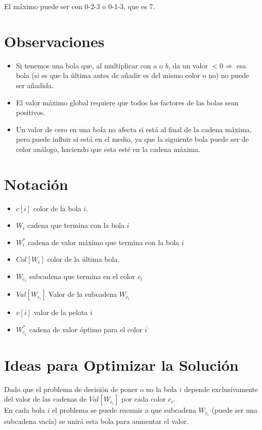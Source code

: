 \documentclass{article}
\begin{document}
El máximo puede ser con 0-2-3 o 0-1-3, que es 7.

\section*{Observaciones}
\begin{itemize}
    \item Si tenemos una bola que, al multiplicar con $a$ o $b$, da un valor $< 0 \Rightarrow$ esa bola (si es que la última antes de añadir es del mismo color o no) no puede ser añadida.
    \item El valor máximo global requiere que todos los factores de las bolas sean positivos.
    \item Un valor de cero en una bola no afecta si está al final de la cadena máxima, pero puede influir si está en el medio, ya que la siguiente bola puede ser de color análogo, haciendo que esta esté en la cadena máxima.
\end{itemize}


\section*{Notación}
\begin{itemize}
    \item $c[i]$ color de la bola $i$.
    \item $W_i$ cadena que termina con la bola $i$
    \item $W_i^*$ cadena de valor máximo que termina con la bola $i$
    \item $Col[W_i]$ color de la última bola.
    \item $W_{c_i}$ subcadena que termina en el color $c_i$
    \item $Val[W_{c_i}]$ Valor de la subcadena $W_{c_i}$
    \item $v[i]$ valor de la pelota $i$
    \item $W_{c_i}^*$  cadena de valor óptimo para el color $i$
\end{itemize}

\section*{Ideas para Optimizar la Solución}
Dado que el problema de decisión de poner o no la bola $i$ depende exclusivamente del valor de las cadenas de $Val[W_{c_i}]$
por cada color $c_i$.\\
En cada bola $i$ el problema se puede resumir a que subcadena $W_{c_i}$ (puede ser una subcadena vacía) 
se unirá esta bola para aumentar el valor.
\end{document}
